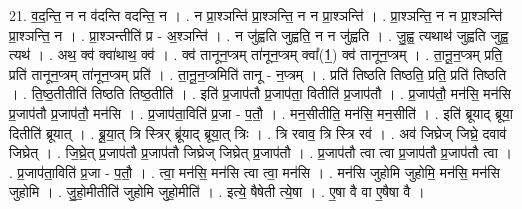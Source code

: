 \documentclass[17pt]{extarticle}
\begin{document}
21. व॒द॒न्ति॒ न न व॑दन्ति वदन्ति॒ न । . न प्रा॒श्ञन्ति॑ प्रा॒श्ञन्ति॒ न न प्रा॒श्ञन्ति॑ । . प्रा॒श्ञन्ति॒ न न प्रा॒श्ञन्ति॑ प्रा॒श्ञन्ति॒ न । . प्रा॒श्ञन्तीति॑ प्र - अ॒श्ञन्ति॑ । . न जु॑ह्वति जुह्वति॒ न न जु॑ह्वति । . जु॒ह्व॒ त्यथाथ॑ जुह्वति जुह्व॒ त्यथ॑ । . अथ॒ क्व॑ क्वा॑थाथ॒ क्व॑ । . क्व॑ तानून॒प्त्रम् ता॑नून॒प्त्रम् क्वा᳚(1॒) क्व॑ तानून॒प्त्रम् । . ता॒नू॒न॒प्त्रम् प्रति॒ प्रति॑ तानून॒प्त्रम् ता॑नून॒प्त्रम् प्रति॑ । . ता॒नू॒न॒प्त्रमिति॑ तानू - न॒प्त्रम् । . प्रति॑ तिष्ठति तिष्ठति॒ प्रति॒ प्रति॑ तिष्ठति । . ति॒ष्ठ॒तीतीति॑ तिष्ठति तिष्ठ॒तीति॑ । . इति॑ प्र॒जाप॑तौ प्र॒जाप॑ता॒ वितीति॑ प्र॒जाप॑तौ । . प्र॒जाप॑तौ॒ मन॑सि॒ मन॑सि प्र॒जाप॑तौ प्र॒जाप॑तौ॒ मन॑सि । . प्र॒जाप॑ता॒विति॑ प्र॒जा - प॒तौ॒ । . मन॒सीतीति॒ मन॑सि॒ मन॒सीति॑ । . इति॑ ब्रूयाद् ब्रूया॒ दितीति॑ ब्रूयात् । . ब्रू॒या॒त् त्रि स्त्रिर् ब्रू॑याद् ब्रूया॒त् त्रिः । . त्रि रवाव॒ त्रि स्त्रि रव॑ । . अव॑ जिघ्रेज् जिघ्रे॒ दवाव॑ जिघ्रेत् । . जि॒घ्रे॒त् प्र॒जाप॑तौ प्र॒जाप॑तौ जिघ्रेज् जिघ्रेत् प्र॒जाप॑तौ । . प्र॒जाप॑तौ त्वा त्वा प्र॒जाप॑तौ प्र॒जाप॑तौ त्वा । . प्र॒जाप॑ता॒विति॑ प्र॒जा - प॒तौ॒ । . त्वा॒ मन॑सि॒ मन॑सि त्वा त्वा॒ मन॑सि । . मन॑सि जुहोमि जुहोमि॒ मन॑सि॒ मन॑सि जुहोमि । . जु॒हो॒मीतीति॑ जुहोमि जुहो॒मीति॑ । . इत्ये॒ षैषेती त्ये॒षा । . ए॒षा वै वा ए॒षैषा वै । \newline
\end{document}
